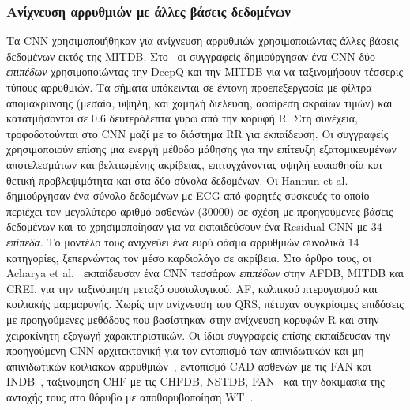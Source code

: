 \subsubsection{Ανίχνευση αρρυθμιών με άλλες βάσεις δεδομένων}
Τα CNN χρησιμοποιήθηκαν για ανίχνευση αρρυθμιών χρησιμοποιώντας άλλες βάσεις δεδομένων εκτός της MITDB\@.
Στο~\cite{wu2018personalizing} οι συγγραφείς δημιούργησαν ένα CNN δύο \textit{επιπέδων} χρησιμοποιώντας την DeepQ και την MITDB για να ταξινομήσουν τέσσερις τύπους αρρυθμιών.
Τα σήματα υπόκεινται σε έντονη προεπεξεργασία με φίλτρα απομάκρυνσης (μεσαία, υψηλή, και χαμηλή διέλευση, αφαίρεση ακραίων τιμών) και κατατμήσονται σε 0.6 δευτερόλεπτα γύρω από την κορυφή R.
Στη συνέχεια, τροφοδοτούνται στο CNN μαζί με το διάστημα RR για εκπαίδευση.
Οι συγγραφείς χρησιμοποιούν επίσης μια ενεργή μέθοδο μάθησης για την επίτευξη εξατομικευμένων αποτελεσμάτων και βελτιωμένης ακρίβειας, επιτυγχάνοντας υψηλή ευαισθησία και θετική προβλεψιμότητα και στα δύο σύνολα δεδομένων.
Οι Hannun et al.~\cite{hannun2019cardiologist} δημιούργησαν ένα σύνολο δεδομένων με ECG από φορητές συσκευές το οποίο περιέχει τον μεγαλύτερο αριθμό ασθενών (30000) σε σχέση με προηγούμενες βάσεις δεδομένων και το χρησιμοποίησαν για να εκπαιδεύσουν ένα Residual-CNN με 34 \textit{επίπεδα}.
Το μοντέλο τους ανιχνεύει ένα ευρύ φάσμα αρρυθμιών συνολικά 14 κατηγορίες, ξεπερνώντας τον μέσο καρδιολόγο σε ακρίβεια.
Στο άρθρο τους, οι Acharya et al.~\cite{acharya2017automateda} εκπαίδευσαν ένα CNN τεσσάρων \textit{επιπέδων} στην AFDB, MITDB και CREI, για την ταξινόμηση μεταξύ φυσιολογικού, AF, κολπικού πτερυγισμού και κοιλιακής μαρμαρυγής.
Χωρίς την ανίχνευση του QRS, πέτυχαν συγκρίσιμες επιδόσεις με προηγούμενες μεθόδους που βασίστηκαν στην ανίχνευση κορυφών R και στην χειροκίνητη εξαγωγή χαρακτηριστικών.
Οι ίδιοι συγγραφείς επίσης εκπαίδευσαν την προηγούμενη CNN αρχιτεκτονική για τον εντοπισμό των απινιδωτικών και μη-απινιδωτικών κοιλιακών αρρυθμιών~\cite{acharya2018automated}, εντοπισμό CAD ασθενών με τις FAN και INDB~\cite{acharya2017automatedb}, ταξινόμηση CHF με τις CHFDB, NSTDB, FAN~\cite{acharya2018deep} και την δοκιμασία της αντοχής τους στο θόρυβο με αποθορυβοποίηση WT~\cite{acharya2017application}.

